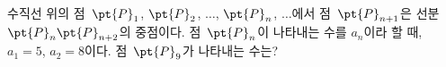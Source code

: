 수직선 위의 점~$\pt{P}_1$, $\pt{P}_2$, $\ldots$, $\pt{P}_n$, $\ldots$에서 점~$\pt{P}_{n+1}$은 선분~$\pt{P}_n\pt{P}_{n+2}$의 중점이다. 점~$\pt{P}_n$이 나타내는 수를 $a_n$이라 할 때, $a_1=5$, $a_2=8$이다. 점~$\pt{P}_9$가 나타내는 수는?
